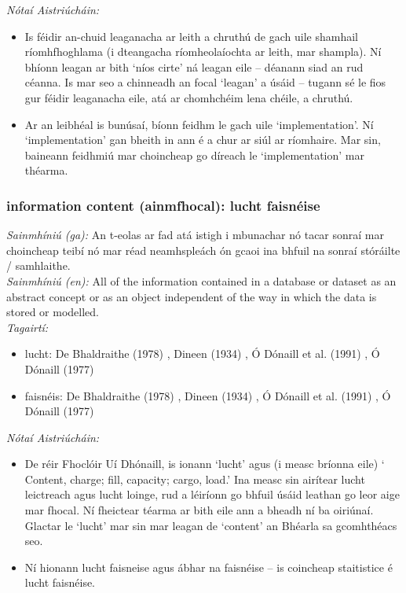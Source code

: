  \noindent \textit{Nótaí Aistriúcháin:}
\begin{itemize}
	\item Is féidir an-chuid leaganacha ar leith a chruthú de gach uile shamhail ríomhfhoghlama (i dteangacha ríomheolaíochta ar leith, mar shampla). Ní bhíonn leagan ar bith `níos cirte' ná leagan eile -- déanann siad an rud céanna. Is mar seo a chinneadh an focal `leagan' a úsáid -- tugann sé le fios gur féidir leaganacha eile, atá ar chomhchéim lena chéile, a chruthú.
	\item Ar an leibhéal is bunúsaí, bíonn feidhm le gach uile `implementation'. Ní `implementation' gan bheith in ann é a chur ar siúl ar ríomhaire. Mar sin, baineann feidhmiú mar choincheap go díreach le `implementation' mar théarma.
\end{itemize}


\subsubsection*{information content (ainmfhocal): lucht faisnéise}
 \noindent \textit{Sainmhíniú (ga):} An t-eolas ar fad atá istigh i mbunachar nó tacar sonraí mar choincheap teibí nó mar réad neamhspleách ón gcaoi ina bhfuil na sonraí stóráilte / samhlaithe.
\\
 \noindent \textit{Sainmhíniú (en):} All of the information contained in a database or dataset as an abstract concept or as an object independent of the way in which the data is stored or modelled.
\\
 \noindent \textit{Tagairtí:}
\begin{itemize}
	\item lucht: De Bhaldraithe (1978) \cite{de-bhaldraithe}, Dineen (1934) \cite{dineen}, Ó Dónaill et al. (1991) \cite{focloir-beag}, Ó Dónaill (1977) \cite{odonaill}
	\item faisnéis: De Bhaldraithe (1978) \cite{de-bhaldraithe}, Dineen (1934) \cite{dineen}, Ó Dónaill et al. (1991) \cite{focloir-beag}, Ó Dónaill (1977) \cite{odonaill}
\end{itemize}

 \noindent \textit{Nótaí Aistriúcháin:}
\begin{itemize}
	\item De réir Fhoclóir Uí Dhónaill, is ionann `lucht' agus (i measc bríonna eile) ` Content, charge; fill, capacity; cargo, load.' Ina measc sin airítear lucht leictreach agus lucht loinge, rud a léiríonn go bhfuil úsáid leathan go leor aige mar fhocal. Ní fheictear téarma ar bith eile ann a bheadh ní ba oiriúnaí. Glactar le `lucht' mar sin mar leagan de `content' an Bhéarla sa gcomhthéacs seo.
	\item Ní hionann lucht faisneise agus ábhar na faisnéise -- is coincheap staitistice é lucht faisnéise.
\end{itemize}



